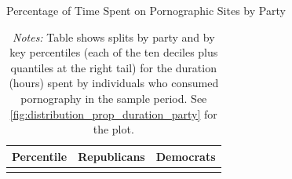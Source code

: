 \documentclass[12pt, letterpaper]{article}
\begin{document}
\begin{table}[ht] \centering \small \setlength\tabcolsep{10 pt}
	\caption{Percentage of Time Spent on Pornographic Sites by Party}
	\label{tab:distribution_prop_duration_party}
	\begin{adjustbox}{max width=\textwidth}
		\begin{tabular}{crr}
			\toprule
			\multicolumn{1}{l}{\textbf{Percentile}}&\multicolumn{1}{c}{\textbf{Republicans}}&\multicolumn{1}{r}{\textbf{Democrats}}\\
			\midrule
			\\
			\bottomrule
		\end{tabular}
	\end{adjustbox}
	\caption*{\footnotesize \emph{Notes:} 
		Table shows splits by party and by key percentiles (each of the ten deciles plus quantiles at the right tail) for the duration (hours) spent by individuals who consumed pornography in the sample period. See \cref{fig:distribution_prop_duration_party} for the plot.
	}
\end{table}
\end{document}

